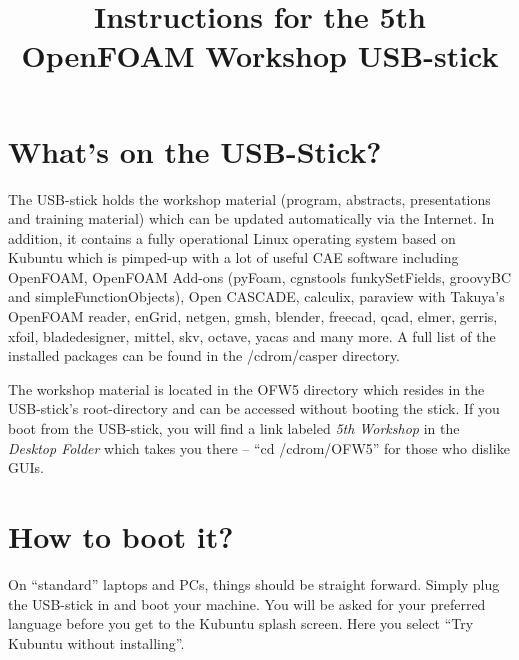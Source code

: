 \documentclass[11pt,a4paper,twocolumn]{article}
\begin{document}
\renewcommand{\enumhook}{\setlength{\topsep}{0pt}%
  \setlength{\itemsep}{0pt}}

\setlength{\columnseprule}{1pt}

\makeatletter
\renewcommand{\@maketitle}{
\newpage
 \null
 \vskip 2em%
 \begin{center}%
  {\LARGE \@title \par}%
 \end{center}%
 \par} \makeatother
\title{Instructions for the 5th OpenFOAM Workshop USB-stick}
\maketitle

\section{What's on the USB-Stick?}

The USB-stick holds the workshop material (program, abstracts, presentations and
training material) which can be updated automatically via the Internet. In
addition, it contains a fully operational Linux operating system based on
Kubuntu which is pimped-up with a lot of useful CAE software including OpenFOAM,
OpenFOAM Add-ons (pyFoam, cgnstools funkySetFields, groovyBC and
simpleFunctionObjects), Open CASCADE, calculix, paraview with Takuya's OpenFOAM
reader, enGrid, netgen, gmsh, blender, freecad, qcad, elmer, gerris, xfoil,
bladedesigner, mittel, skv, octave, yacas and many more. A full list of the
installed packages can be found in the /cdrom/casper directory.

The workshop material is located in the OFW5 directory which resides in the
USB-stick's root-directory and can be accessed without booting the stick.  If
you boot from the USB-stick, you will find a link labeled \emph{5th Workshop} in
the \emph{Desktop Folder} which takes you there -- ``cd /cdrom/OFW5'' for those
who dislike GUIs.

\section{How to boot it?}

On ``standard'' laptops and PCs, things should be straight forward. Simply plug
the USB-stick in and boot your machine. You will be asked for your preferred
language before you get to the Kubuntu splash screen. Here you select ``Try
Kubuntu without installing''.
\end{document}
